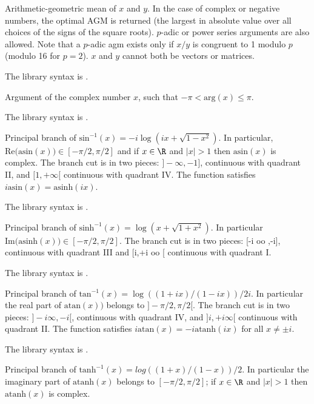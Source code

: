 \label{se:agm}
Arithmetic-geometric mean of $x$ and $y$. In the
case of complex or negative numbers, the optimal AGM is returned
(the largest in absolute value over all choices of the signs of the square
roots).  $p$-adic or power series arguments are also allowed. Note that
a $p$-adic agm exists only if $x/y$ is congruent to 1 modulo $p$ (modulo
16 for $p=2$). $x$ and $y$ cannot both be vectors or matrices.

The library syntax is .

\label{se:arg}
Argument of the complex number $x$, such that $-\pi<\text{arg}(x)\le\pi$.

The library syntax is .

\label{se:asin}
Principal branch of $\text{sin}^{-1}(x) = -i \log(ix + \sqrt{1 - x^2})$.
In particular, $\text{Re(asin}(x))\in [-\pi/2,\pi/2]$ and if $x\in \R$ and
$|x|>1$ then $\text{asin}(x)$ is complex. The branch cut is in two pieces:
$]-\infty,-1]$, continuous with quadrant II, and $[1,+\infty[$ continuous
with quadrant IV. The function satisfies $i \text{asin}(x) =
\text{asinh}(ix)$.

The library syntax is .

\label{se:asinh}
Principal branch of $\text{sinh}^{-1}(x) = \log(x + \sqrt{1+x^2})$. In
particular $\text{Im(asinh}(x))\in [-\pi/2,\pi/2]$.
The branch cut is in two pieces: [-i oo ,-i],  continuous with quadrant III
and [i,+i oo [ continuous with quadrant I.

The library syntax is .

\label{se:atan}
Principal branch of $\text{tan}^{-1}(x) = \log ((1+ix)/(1-ix)) /
2i$. In particular the real part of $\text{atan}(x))$ belongs to
$]-\pi/2,\pi/2[$.
The branch cut is in two pieces:
$]-i\infty,-i[$, continuous with quadrant IV, and $]i,+i \infty[$ continuous
with quadrant II. The function satisfies $i \text{atan}(x) =
-i\text{atanh}(ix)$ for all $x\neq \pm i$.

The library syntax is .

\label{se:atanh}
Principal branch of $\text{tanh}^{-1}(x) = log ((1+x)/(1-x)) / 2$. In
particular the imaginary part of $\text{atanh}(x)$ belongs to
$[-\pi/2,\pi/2]$; if $x\in \R$ and $|x|>1$ then $\text{atanh}(x)$ is complex.

